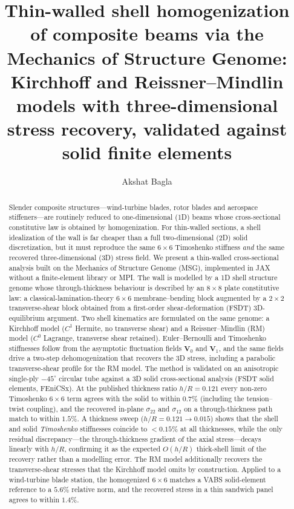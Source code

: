 \documentclass[preprint,12pt]{elsarticle}
\newcommand{\bV}{\mathbf{V}}
\newcommand{\hR}{h/R}
\begin{document}
\begin{frontmatter}

\title{Thin-walled shell homogenization of composite beams via the Mechanics
of Structure Genome: Kirchhoff and Reissner--Mindlin models with
three-dimensional stress recovery, validated against solid finite elements}

\author[purdue]{Akshat Bagla}
\address[purdue]{School of Aeronautics and Astronautics, Purdue University,
West Lafayette, IN 47907, USA}

\begin{abstract}
Slender composite structures---wind-turbine blades, rotor blades and aerospace
stiffeners---are routinely reduced to one-dimensional (1D) beams whose
cross-sectional constitutive law is obtained by homogenization. For
thin-walled sections, a shell idealization of the wall is far cheaper than a
full two-dimensional (2D) solid discretization, but it must reproduce the same
$6\times6$ Timoshenko stiffness \emph{and} the same recovered three-dimensional
(3D) stress field. We present a thin-walled cross-sectional analysis built on
the Mechanics of Structure Genome (MSG), implemented in JAX without a
finite-element library or MPI. The wall is modelled by a 1D shell structure
genome whose through-thickness behaviour is described by an $8\times8$ plate
constitutive law: a classical-lamination-theory $6\times6$ membrane--bending
block augmented by a $2\times2$ transverse-shear block obtained from a
first-order shear-deformation (FSDT) 3D-equilibrium argument. Two shell
kinematics are formulated on the same genome: a Kirchhoff model
($C^{1}$ Hermite, no transverse shear) and a Reissner--Mindlin (RM) model
($C^{0}$ Lagrange, transverse shear retained). Euler--Bernoulli and Timoshenko
stiffnesses follow from the asymptotic fluctuation fields $\bV_0$ and $\bV_1$,
and the same fields drive a two-step dehomogenization that recovers the 3D
stress, including a parabolic transverse-shear profile for the RM model. The
method is validated on an anisotropic single-ply $-45^{\circ}$ circular tube
against a 3D solid cross-sectional analysis (FSDT solid elements, FEniCSx).
At the published thickness ratio $\hR=0.121$ every non-zero Timoshenko
$6\times6$ term agrees with the solid to within $0.7\%$ (including the
tension--twist coupling), and the recovered in-plane $\sigma_{22}$ and
$\sigma_{12}$ on a through-thickness path match to within $1.5\%$. A thickness
sweep ($\hR=0.121\!\to\!0.015$) shows that the shell and solid \emph{Timoshenko}
stiffnesses coincide to $<0.15\%$ at all thicknesses, while the only residual
discrepancy---the through-thickness gradient of the axial stress---decays
linearly with $\hR$, confirming it as the expected $O(\hR)$ thick-shell limit
of the recovery rather than a modelling error. The RM model additionally
recovers the transverse-shear stresses that the Kirchhoff model omits by
construction. Applied to a wind-turbine blade station, the homogenized
$6\times6$ matches a VABS solid-element reference to a $5.6\%$ relative norm, and
the recovered stress in a thin sandwich panel agrees to within $1.4\%$.
\end{abstract}


\end{frontmatter}
\end{document}
